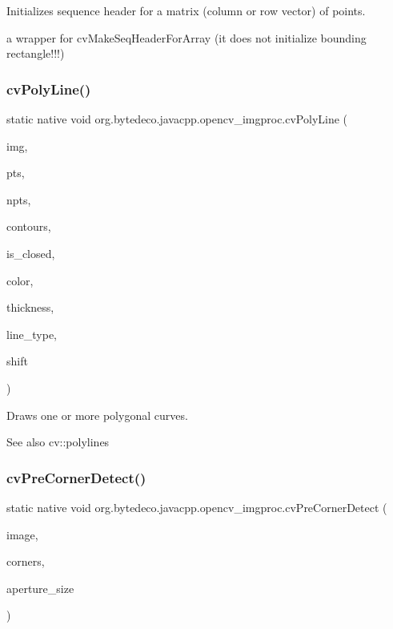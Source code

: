 Initializes sequence header for a matrix (column or row vector) of points. 

a wrapper for cv\+Make\+Seq\+Header\+For\+Array (it does not initialize bounding rectangle!!!) \mbox{\label{group__imgproc__c_ga6e673e2e62b461c739fd8ac6fef9d226}} 
\subsubsection{\texorpdfstring{cv\+Poly\+Line()}{cvPolyLine()}}
{\footnotesize\ttfamily static native void org.\+bytedeco.\+javacpp.\+opencv\+\_\+imgproc.\+cv\+Poly\+Line (\begin{DoxyParamCaption}\item[{Cv\+Arr}]{img,  }\item[{@Cast(\char`\"{}Cv\+fr.antproject.utils.Point$\ast$$\ast$\char`\"{}) Pointer\+Pointer}]{pts,  }\item[{@Const Int\+Pointer}]{npts,  }\item[{int}]{contours,  }\item[{int}]{is\+\_\+closed,  }\item[{@By\+Val Cv\+Scalar}]{color,  }\item[{int}]{thickness,  }\item[{int}]{line\+\_\+type,  }\item[{int}]{shift }\end{DoxyParamCaption})\hspace{0.3cm}{\ttfamily [static]}}



Draws one or more polygonal curves. 

\begin{DoxySeeAlso}{See also}
cv\+::polylines 
\end{DoxySeeAlso}
\mbox{\label{group__imgproc__c_ga8412612edd153c979f48d7eab0f99cc7}} 
\subsubsection{\texorpdfstring{cv\+Pre\+Corner\+Detect()}{cvPreCornerDetect()}}
{\footnotesize\ttfamily static native void org.\+bytedeco.\+javacpp.\+opencv\+\_\+imgproc.\+cv\+Pre\+Corner\+Detect (\begin{DoxyParamCaption}\item[{@Const Cv\+Arr}]{image,  }\item[{Cv\+Arr}]{corners,  }\item[{int}]{aperture\+\_\+size }\end{DoxyParamCaption})\hspace{0.3cm}{\ttfamily [static]}}



